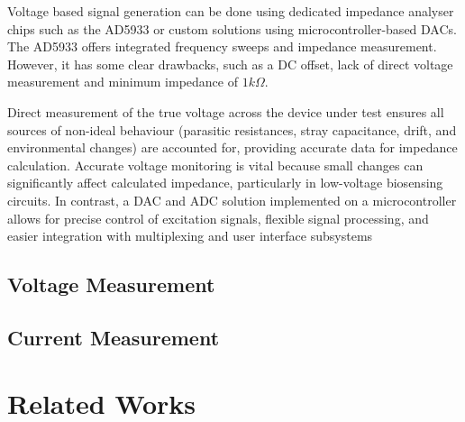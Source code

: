 Voltage based signal generation can be done using dedicated impedance analyser chips such as the AD5933 or custom solutions using microcontroller-based \acp{DAC}. The AD5933 offers integrated frequency sweeps and impedance measurement. However, it has some clear drawbacks, such as a DC offset, lack of direct voltage measurement and minimum impedance of $1 k\Omega$.

Direct measurement of the true voltage across the device under test ensures all sources of non-ideal behaviour (parasitic resistances, stray capacitance, drift, and environmental changes) are accounted for, providing accurate data for impedance calculation. Accurate voltage monitoring is vital because small changes can significantly affect calculated impedance, particularly in low-voltage biosensing circuits. In contrast, a DAC and ADC solution implemented on a microcontroller allows for precise control of excitation signals, flexible signal processing, and easier integration with multiplexing and user interface subsystems

\subsection{Voltage Measurement}

\subsection{Current Measurement}

\section{Related Works}

\label{chap:literature_review}